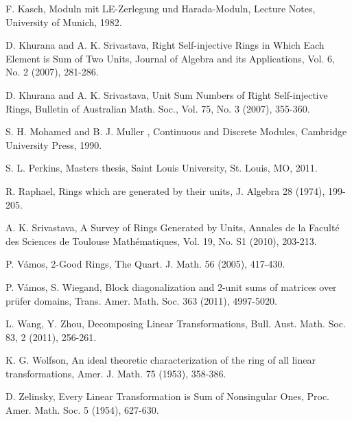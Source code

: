 \documentclass{amsart}
\begin{document}
\begin{thebibliography}{99}
F. Kasch, Moduln mit LE-Zerlegung und Harada-Moduln, Lecture Notes, University of Munich, 1982.

D. Khurana and A. K. Srivastava, Right Self-injective Rings in Which
Each Element is Sum of Two Units, Journal of Algebra and its Applications,
Vol. 6, No. 2 (2007), 281-286.

D. Khurana and A. K. Srivastava, Unit Sum Numbers of Right
Self-injective Rings, Bulletin of Australian Math. Soc., Vol. 75, No. 3
(2007), 355-360.

 S. H. Mohamed and B. J. Muller , Continuous and Discrete Modules,
Cambridge University Press, 1990.

S. L. Perkins, Masters thesis, Saint Louis University, St. Louis, MO, 2011.

R. Raphael, Rings which are generated by their units, J. Algebra 28
(1974), 199-205.

A. K. Srivastava, A Survey of Rings Generated by Units, Annales de la Facult\'{e} des Sciences de Toulouse Math\'{e}matiques, Vol. 19, No. S1 (2010), 203-213.

P. V\'{a}mos, 2-Good Rings, The Quart. J. Math. 56 (2005), 417-430.

P. V\'{a}mos, S. Wiegand, Block diagonalization and 2-unit sums of matrices over pr\"{u}fer domains, Trans. Amer. Math. Soc. 363 (2011), 4997-5020. 

L. Wang, Y. Zhou, Decomposing Linear Transformations, Bull. Aust. Math. Soc. 83, 2 (2011), 256-261.

K. G. Wolfson, An ideal theoretic characterization of the ring of all
linear transformations, Amer. J. Math. 75 (1953), 358-386.

D. Zelinsky, Every Linear Transformation is Sum of Nonsingular Ones,
Proc. Amer. Math. Soc. 5 (1954), 627-630.
\end{thebibliography}

\bigskip

\bigskip
\end{document}
